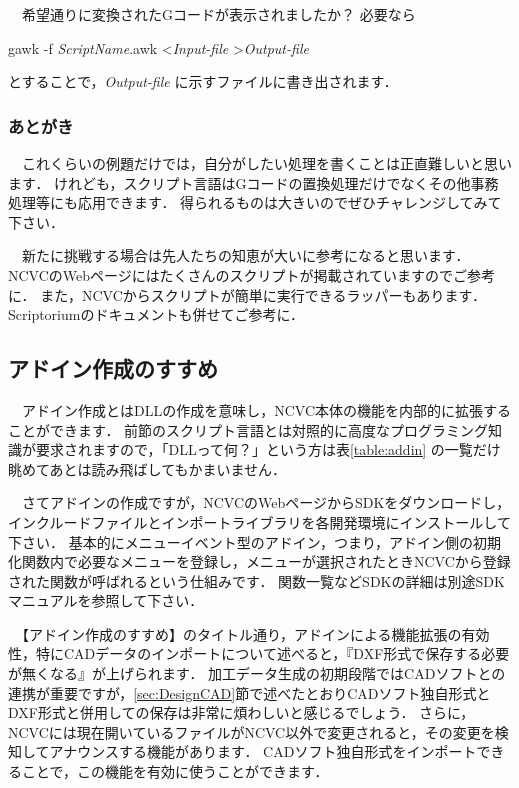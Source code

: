 \vspace*{1zh}
　希望通りに変換されたGコードが表示されましたか？
必要なら

\vspace*{1zh}
\begin{shadebox}
gawk -f \textit{ScriptName}.awk \textless \textit{Input-file} \textgreater \textit{Output-file}
\end{shadebox}

\vspace*{1zh}
とすることで，\textit{Output-file} に示すファイルに書き出されます．

\subsubsection{あとがき}
　これくらいの例題だけでは，自分がしたい処理を書くことは正直難しいと思います．
けれども，スクリプト言語はGコードの置換処理だけでなくその他事務処理等にも応用できます．
得られるものは大きいのでぜひチャレンジしてみて下さい．

　新たに挑戦する場合は先人たちの知恵が大いに参考になると思います．
NCVCのWebページにはたくさんのスクリプトが掲載されていますのでご参考に．
また，NCVCからスクリプトが簡単に実行できるラッパーもあります．Scriptoriumのドキュメントも併せてご参考に．

\subsection{アドイン作成のすすめ}
　アドイン作成とはDLLの作成を意味し，NCVC本体の機能を内部的に拡張することができます．
前節のスクリプト言語とは対照的に高度なプログラミング知識が要求されますので，「DLLって何？」という方は表\ref{table:addin} の一覧だけ眺めてあとは読み飛ばしてもかまいません．

　さてアドインの作成ですが，NCVCのWebページからSDKをダウンロードし，インクルードファイルとインポートライブラリを各開発環境にインストールして下さい．
基本的にメニューイベント型のアドイン，つまり，アドイン側の初期化関数内で必要なメニューを登録し，メニューが選択されたときNCVCから登録された関数が呼ばれるという仕組みです．
関数一覧などSDKの詳細は別途SDKマニュアルを参照して下さい．

　【アドイン作成のすすめ】のタイトル通り，アドインによる機能拡張の有効性，特にCADデータのインポートについて述べると，『DXF形式で保存する必要が無くなる』が上げられます．
加工データ生成の初期段階ではCADソフトとの連携が重要ですが，\ref{sec:DesignCAD}節で述べたとおりCADソフト独自形式とDXF形式と併用しての保存は非常に煩わしいと感じるでしょう．
さらに，NCVCには現在開いているファイルがNCVC以外で変更されると，その変更を検知してアナウンスする機能があります．
CADソフト独自形式をインポートできることで，この機能を有効に使うことができます．

